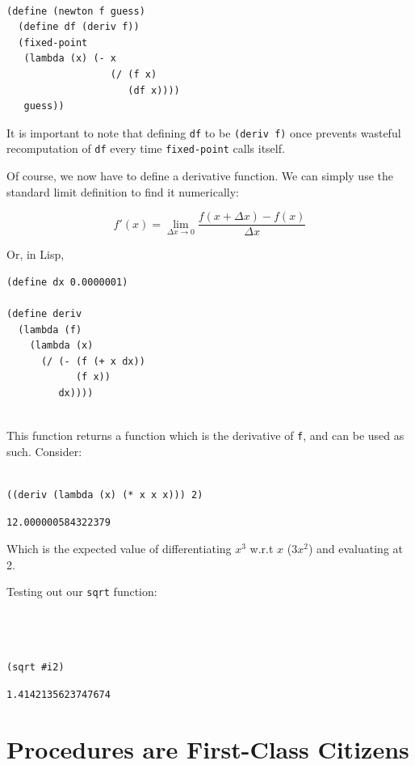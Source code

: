\documentclass[9pt]{report}
\begin{document}
\begin{verbatim}

(define (newton f guess)
  (define df (deriv f))
  (fixed-point
   (lambda (x) (- x
                  (/ (f x)
                     (df x))))
   guess))
\end{verbatim}


It is important to note that defining \texttt{df} to be \texttt{(deriv f)} once
prevents wasteful recomputation of \texttt{df} every time \texttt{fixed-point}
calls itself.

Of course, we now have to define a derivative function. We can
simply use the standard limit definition to find it numerically:

$$f'(x) = \lim_{\Delta x\to 0} \frac{f(x+\Delta x) - f(x)}{\Delta
   x}$$

Or, in Lisp,

\begin{verbatim}
(define dx 0.0000001)

(define deriv
  (lambda (f)
    (lambda (x)
      (/ (- (f (+ x dx))
            (f x))
         dx))))


\end{verbatim}

This function returns a function which is the derivative of \texttt{f},
and can be used as such. Consider:

\begin{verbatim}

((deriv (lambda (x) (* x x x))) 2)
\end{verbatim}

\begin{verbatim}
12.000000584322379
\end{verbatim}


Which is the expected value of differentiating \(x^{3}\) w.r.t \(x\)
(\(3x^2\)) and evaluating at 2.

Testing out our \texttt{sqrt} function:

\begin{verbatim}



(sqrt #i2)
\end{verbatim}

\begin{verbatim}
1.4142135623747674
\end{verbatim}

\section{Procedures are First-Class Citizens}
\label{sec:orgfcd1729}
\end{document}
